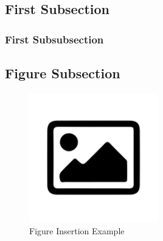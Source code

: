 \subsection{First Subsection}\label{subsec:first-subsection}
\lipsum[1]

\subsubsection{First Subsubsection}\label{subsubsec:first-subsubsection}
\lipsum[1]

\subsection{Figure Subsection}\label{subsec:figure-subsection}
\lipsum[1]
\begin{figure}[htbp]
    \centering
    \includegraphics[width=0.5\textwidth]{resources/default}
    \caption{
        Figure Insertion Example
    }
    \label{fig:figure-insertion-example}
\end{figure}